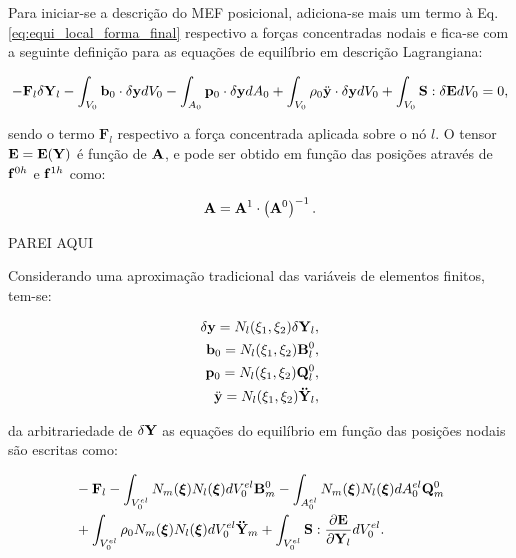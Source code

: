 \documentclass[tese_patricia]{subfiles}
\begin{document}
Para iniciar-se a descrição do MEF posicional, adiciona-se mais um termo à Eq. \eqref{eq:equi_local_forma_final} respectivo a forças concentradas nodais e fica-se com a seguinte definição para as equações de equilíbrio em descrição Lagrangiana:

\begin{align}
 -\mathbf{F}_{l}\delta\mathbf{Y}_{l} - \int_{V_{0}}\mathbf{b}_0 \cdot \delta\mathbf{y} dV_{0} - \int_{A_{0}} \mathbf{p}_{0} \cdot \delta\mathbf{y} dA_{0} + \int_{V_{0}} \rho_{0} \ddot{\mathbf{y}} \cdot \delta\mathbf{y} dV_{0} + \int_{V_{0}} \mathbf{S} : \delta\mathbf{E} dV_{0} = 0,
\end{align}

\noindent sendo o termo $\mathbf{F}_{l}$ respectivo a força concentrada aplicada sobre o nó $l$. O tensor $\mathbf{E} = \mathbf{E} (\mathbf{Y})$ é função de $\mathbf{A}$, e pode ser obtido em função das posições através de $\mathbf{f}^{0h} $ e $\mathbf{f}^{1h} $ como:

\begin{align}
\mathbf{A} = \mathbf{A}^{1} \cdot \left(\mathbf{A}^{0}\right)^{-1} \label{eq:gradDeformation}.
\end{align}

PAREI AQUI

Considerando uma aproximação tradicional das variáveis de elementos finitos, tem-se:

\begin{align}
\delta\mathbf{y} = N_{l} (\xi_{1},\xi_{2})\delta\mathbf{Y}_{l},\\
\mathbf{b}_0 = N_{l} (\xi_{1},\xi_{2}) \mathbf{B}_{l}^{0},\\
\mathbf{p}_{0} = N_{l} (\xi_{1},\xi_{2}) \mathbf{Q}_{l}^{0},\\
\ddot{\mathbf{y}} = N_{l} (\xi_{1},\xi_{2}) \mathbf{\ddot{Y}}_{l},
\end{align}

\noindent da arbitrariedade de $\delta\mathbf{Y}$ as equações do equilíbrio em função das posições nodais são escritas como:

\begin{align}
\begin{split}
&-\mathbf{F}_{l} - \int_{V_{0}^{el}}N_{m} (\bm{\xi})N_{l} (\bm{\xi})dV_{0}^{el} \mathbf{B}_{m}^{0} -\int_{A_{0}^{el}}N_{m} (\bm{\xi})N_{l} (\bm{\xi})dA_{0}^{el} \mathbf{Q}_{m}^{0}  \\& + \int_{V_{0}^{el}}\rho_{0} N_{m} (\bm{\xi})N_{l} (\bm{\xi})dV_{0}^{el} \mathbf{\ddot{Y}}_{m} + \int_{V_{0}^{el}} \mathbf{S} : \frac{\partial\mathbf{E}}{\partial\mathbf{Y}_{l}}dV_{0}^{el}.
\end{split}
\end{align}
\end{document}
